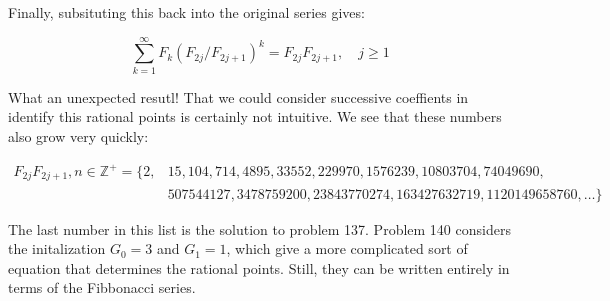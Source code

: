 \documentclass[12pt]{article}
\begin{document}
\newpage

Finally, subsituting this back into the original series gives:

$$
\sum_{k=1}^\infty F_k (F_{2j}/F_{2j+1})^k = F_{2j}F_{2j+1}, \quad j \geq 1
$$

What an unexpected resutl! That we could consider successive coeffients in identify this rational points is certainly not intuitive. We see that these numbers also grow very quickly:

\begin{align*}
F_{2j}F_{2j+1}, n \in \mathbb{Z}^+= \{2, &15, 104, 714, 4895, 33552, 229970, 1576239, 10803704, 74049690,\\
					          &  507544127, 3478759200, 23843770274, 163427632719, 1120149658760, \dots\}
\end{align*}


The last number in this list is the solution to problem 137. Problem 140 considers the initalization $G_0 = 3$ and $G_1 = 1$, which give a more complicated sort of equation that determines the rational points. Still, they can be written entirely in terms of the Fibbonacci series.
\end{document}
